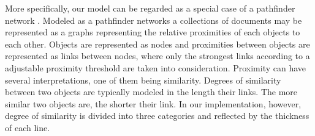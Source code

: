 More specifically, our model can be regarded as a special case of a pathfinder network \cite{schvaneveldt1990pathfinder}.
Modeled as a pathfinder networks a collections of documents may be represented as a graphs representing the relative proximities of each objects to each other. 
Objects are represented as nodes and proximities between objects are represented as links between nodes, where only the strongest links according to a adjustable proximity threshold are taken into consideration. Proximity can have several interpretations, one of them being similarity.
Degrees of similarity between two objects are typically modeled in the length their links. The more similar two objects are, the shorter their link.
In our implementation, however, degree of similarity is divided into three categories and reflected by the thickness of each line.
